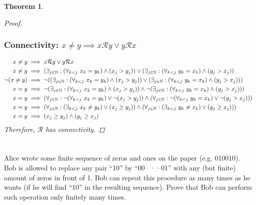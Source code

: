 \documentclass[]{article}
\newcommand{\Rel}{\mathcal{R}}
\newcommand{\N}{\mathbb{N}}
\newtheorem{theorem}{Theorem}
\begin{document}
\begin{theorem}
\begin{proof}
        \subsubsection{Connectivity: $x \neq y \implies x \Rel y \lor y \Rel x$}
        \begin{align*}
            x \neq y &\implies x \Rel y \lor y \Rel x\\
            x \neq y &\implies \qty(\exists_{j\in\N} : \qty(\forall_{k < j} \ x_k = y_k) \land (x_j > y_j))
                \lor \qty(\exists_{j\in\N} : \qty(\forall_{k < j} \ y_k = x_k) \land (y_j > x_j))\\
            \lnot(x \neq y)
                &\implies \lnot \qty(\qty(\exists_{j\in\N} : \qty(\forall_{k < j} \ x_k = y_k) \land (x_j > y_j))
                \lor \qty(\exists_{j\in\N} : \qty(\forall_{k < j} \ y_k = x_k) \land (y_j > x_j)))\\
            x = y &\implies \lnot \qty(\exists_{j\in\N} : \qty(\forall_{k < j} \ x_k = y_k) \land (x_j > y_j))
                \land \lnot \qty(\exists_{j\in\N} : \qty(\forall_{k < j} \ y_k = x_k) \land (y_j > x_j)))\\
            x = y &\implies \qty(\forall_{j\in\N} : \lnot \qty(\forall_{k < j} \ x_k = y_k) \lor \lnot (x_j > y_j))
                \land \qty(\forall_{j\in\N} : \lnot \qty(\forall_{k < j} \ y_k = x_k) \lor \lnot (y_j > x_j)))\\
            x = y &\implies \qty(\forall_{j\in\N} : \qty(\exists_{k < j} \ x_k \neq y_k) \lor (x_j \geq y_j))
                \land \qty(\forall_{j\in\N} : \qty(\exists_{k < j} \ y_k \neq x_k) \lor (y_j \geq x_j)))\\
            x = y &\implies (x_j \geq y_j) \land (y_j \geq x_j)\\
        \end{align*}
        Therefore, $\Rel$ has connectivity.
    \end{proof}
\end{theorem}


\newpage
\section{}
Alice wrote some finite sequence of zeros and ones on the paper (e.g. 010010). 
Bob is allowed to replace any pair ``10'' by ``00···01'' with any (but finite) 
amount of zeros in front of 1. Bob can repeat this procedure as many times as 
he wants (if he will find ``10'' in the resulting sequence). 
Prove that Bob can perform such operation only finitely many times.
\end{document}
